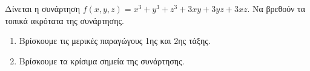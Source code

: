 \documentclass[a4paper,table]{report}
\begin{document}
\begin{mybox3}
  \begin{thema}
    Δίνεται η συνάρτηση $ f(x,y,z)=x^{3}+y^{3}+z^{3}+3xy+3yz+3xz $. Να βρεθούν τα 
    τοπικά ακρότατα της συνάρτησης.
  \end{thema}
\end{mybox3}
\begin{solution}
  \item []
  \begin{enumerate}
    \item Βρίσκουμε τις μερικές παραγώγους 1ης και 2ης τάξης.


    \item Βρίσκουμε τα κρίσιμα σημεία της συνάρτησης.


\end{enumerate}
\end{solution}
\end{document}
